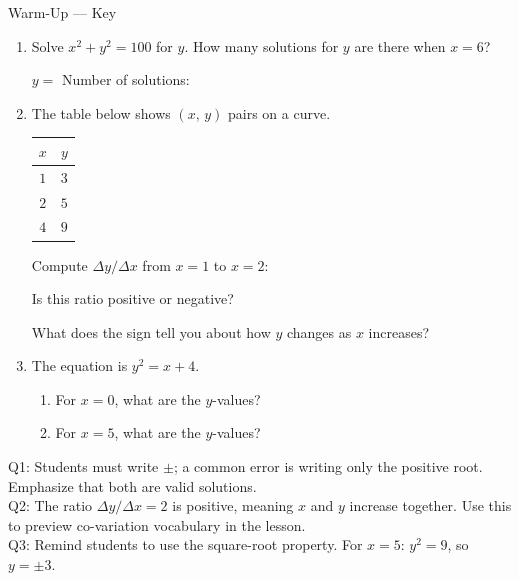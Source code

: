 \documentclass[10pt]{article}
\begin{document}
\namedateperiod

\vspace{0.12in}

\begin{notesbox}{Warm-Up --- Key}
\begin{enumerate}[leftmargin=1.5em, itemsep=6pt]

\item Solve $x^2 + y^2 = 100$ for $y$. How many solutions for $y$ are there when $x = 6$?

\vspace{0.4in}
$y = $  \hfill Number of solutions: 
\vspace{0.1in}

\item The table below shows $(x,\, y)$ pairs on a curve.

\vspace{4pt}
\renewcommand{\arraystretch}{1.3}
\begin{tabular}{c|c}
$x$ & $y$ \\\hline
$1$ & $3$ \\
$2$ & $5$ \\
$4$ & $9$ \\
\end{tabular}

\vspace{6pt}
Compute $\Delta y / \Delta x$ from $x = 1$ to $x = 2$: 

Is this ratio positive or negative? 

What does the sign tell you about how $y$ changes as $x$ increases? 

\vspace{0.1in}

\item The equation is $y^2 = x + 4$.
\begin{enumerate}[leftmargin=1.2em, itemsep=4pt]
    \item[(a)] For $x = 0$, what are the $y$-values? 
    \item[(b)] For $x = 5$, what are the $y$-values? 
\end{enumerate}

\end{enumerate}
\end{notesbox}

\begin{teachernote}
Q1: Students must write $\pm$; a common error is writing only the positive root. Emphasize that both are valid solutions.\\
Q2: The ratio $\Delta y/\Delta x = 2$ is positive, meaning $x$ and $y$ increase together. Use this to preview co-variation vocabulary in the lesson.\\
Q3: Remind students to use the square-root property. For $x = 5$: $y^2 = 9$, so $y = \pm 3$.
\end{teachernote}
\end{document}

